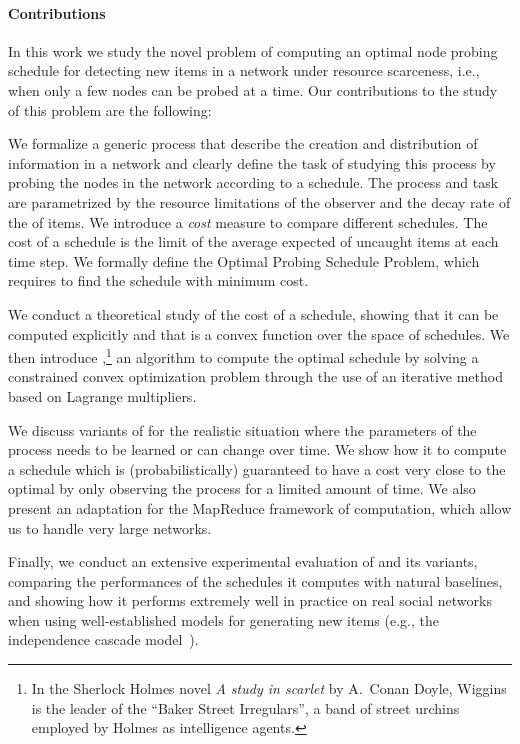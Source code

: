 \paragraph*{Contributions}
In this work we study the novel problem of computing an optimal node probing
schedule for detecting new items in a network under resource scarceness, i.e.,
when only a few nodes can be probed at a time. Our contributions to the study of
this problem are the following:

\begin{itemize*}
	\item We formalize a generic process that describe the creation and
		distribution of information in a network and clearly define the task of
		studying this process by probing the nodes in the network according to a
		schedule. The process and task are parametrized by the resource
		limitations of the observer and the decay rate of the  of
		items. We introduce a \emph{cost} measure to compare different
		schedules. The cost of a schedule is the limit of the average expected
		 of uncaught items at each time step. We formally define
		the Optimal Probing Schedule Problem, which requires to find the
		schedule with minimum cost.
	\item We conduct a theoretical study of the cost of a schedule, showing that
		it can be computed explicitly and that is a convex function over the
		space of schedules. We then introduce \algoname,\footnote{In the Sherlock
		Holmes novel \emph{A study in scarlet} by A.~Conan Doyle, Wiggins is the
	leader of the ``Baker Street Irregulars'', a band of street urchins employed
by Holmes as intelligence agents.} an algorithm to compute the optimal schedule
by solving a constrained convex optimization problem through the use of an
iterative method based on Lagrange multipliers.
	\item We discuss variants of \algoname for the realistic situation where
		the parameters of the process needs to be learned or can change over
		time. We show how it to compute a schedule which is (probabilistically)
		guaranteed to have a cost very close to the optimal by only observing
		the process for a limited amount of time. We also present an adaptation
		for the MapReduce framework of computation, which allow us to handle
		very large networks.
	\item Finally, we conduct an extensive experimental evaluation of \algoname
		and its variants, comparing the performances of the schedules it
		computes with natural baselines, and showing how it performs extremely
		well in practice on real social networks when using well-established
		models for generating new items (e.g., the independence cascade
		model~\citep{Kempe2003}).
\end{itemize*}

